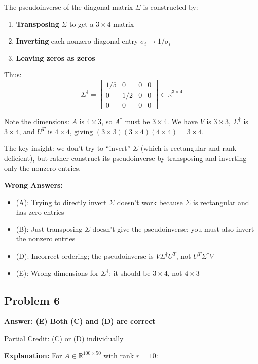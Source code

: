 \documentclass[12pt]{amsart}
\newcommand{\correct}[1]{{\color{correctgreen}\textbf{#1}}}
\newcommand{\partcred}[1]{{\color{partialblue}#1}}
\begin{document}
\begin{itemize}
The pseudoinverse of the diagonal matrix $\Sigma$ is constructed by:
\begin{enumerate}
\item \textbf{Transposing} $\Sigma$ to get a $3 \times 4$ matrix
\item \textbf{Inverting} each nonzero diagonal entry $\sigma_i \to 1/\sigma_i$
\item \textbf{Leaving zeros as zeros}
\end{enumerate}

Thus:
$$\Sigma^\dagger = \begin{bmatrix} 1/5 & 0 & 0 & 0 \\ 0 & 1/2 & 0 & 0 \\ 0 & 0 & 0 & 0 \end{bmatrix} \in \mathbb{R}^{3 \times 4}$$

Note the dimensions: $A$ is $4 \times 3$, so $A^\dagger$ must be $3 \times 4$. We have $V$ is $3 \times 3$, $\Sigma^\dagger$ is $3 \times 4$, and $U^T$ is $4 \times 4$, giving $(3 \times 3)(3 \times 4)(4 \times 4) = 3 \times 4$. \checkmark

The key insight: we don't try to ``invert'' $\Sigma$ (which is rectangular and rank-deficient), but rather construct its pseudoinverse by transposing and inverting only the nonzero entries.

\textbf{Wrong Answers:}
\begin{itemize}
\item (A): Trying to directly invert $\Sigma$ doesn't work because $\Sigma$ is rectangular and has zero entries
\item (B): Just transposing $\Sigma$ doesn't give the pseudoinverse; you must also invert the nonzero entries
\item (D): Incorrect ordering; the pseudoinverse is $V\Sigma^\dagger U^T$, not $U^T\Sigma^\dagger V$
\item (E): Wrong dimensions for $\Sigma^\dagger$; it should be $3 \times 4$, not $4 \times 3$
\end{itemize}

\subsection*{Problem 6}
\correct{Answer: (E) Both (C) and (D) are correct}

\partcred{Partial Credit: (C) or (D) individually}

\textbf{Explanation:} For $A \in \mathbb{R}^{100 \times 50}$ with rank $r = 10$:


\end{itemize}
\end{document}
